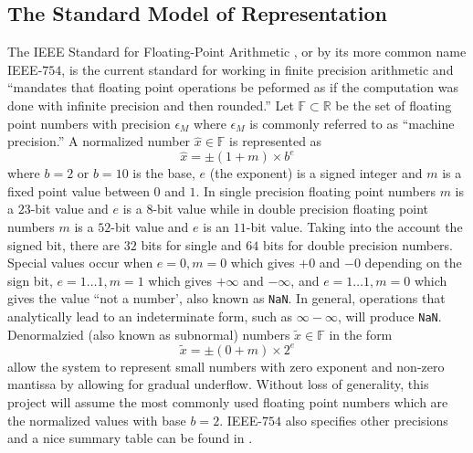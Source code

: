 \documentclass{standalone}
\begin{document}
	\subsection{The Standard Model of Representation}
	The IEEE Standard for Floating-Point Arithmetic \cite{zuras2008ieee}, or by its more common name IEEE-$754$, is the current standard for working in finite precision arithmetic and ``mandates that floating point operations be peformed as if the computation was done with infinite precision and then rounded.'' \cite{boldo2015verified} Let $\mathbb{F}\subset\mathbb{R}$ be the set of floating point numbers with precision $\epsilon_{M}$ where $\epsilon_{M}$ is commonly referred to as ``machine precision.'' A normalized number $\hat{x}\in\mathbb{F}$ is represented as$$\hat{x}=\pm(1+m)\times b^{e}$$where $b=2$ or $b=10$ is the base, $e$ (the exponent) is a signed integer and $m$ is a fixed point value between $0$ and $1$. In single precision floating point numbers $m$ is a $23$-bit value and $e$ is a $8$-bit value while in double precision floating point numbers $m$ is a $52$-bit value and $e$ is an $11$-bit value. Taking into the account the signed bit, there are $32$ bits for single and $64$ bits for double precision numbers. Special values occur when $e=0,m=0$ which gives $+0$ and $-0$ depending on the sign bit, $e=1\dots1,m=1$ which gives $+\infty$ and $-\infty$, and $e=1\dots1,m=0$ which gives the value ``not a number', also known as \texttt{NaN}. In general, operations that analytically lead to an indeterminate form, such as $\infty-\infty$, will produce \texttt{NaN}. Denormalzied (also known as subnormal) numbers $\tilde{x}\in\mathbb{F}$ in the form$$\tilde{x}=\pm(0+m)\times 2^{e}$$allow the system to represent small numbers with zero exponent and non-zero mantissa by allowing for gradual underflow. Without loss of generality, this project will assume the most commonly used floating point numbers which are the normalized values with base $b=2$. IEEE-$754$ also specifies other precisions and a nice summary table can be found in \cite{martel2017floating}.
\end{document}
